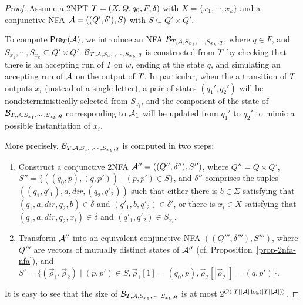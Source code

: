\begin{proof}
Assume a 2NPT $T=(X, Q, q_0, F, \delta)$ with $X = \{x_1,\cdots, x_k\}$ and a conjunctive NFA $\mathcal{A} = ((Q', \delta'), S)$ with $S \subseteq Q' \times Q'$. %

To compute $\textsf{Pre}_{T}(\mathcal{A})$, we introduce an NFA $\mathcal{B}_{T, \mathcal{A}, S_{x_1}, \cdots, S_{x_k}, q}$, %
%
where  $q \in F$, and  $S_{x_1}, \cdots, S_{x_k} \subseteq Q' \times Q'$.   
$\mathcal{B}_{T, \mathcal{A}, S_{x_1}, \cdots, S_{x_k}, q}$ is constructed from $T$  by checking that there is an accepting run of $T$ on $w$, ending at the state $q$, and simulating an accepting run of $\mathcal{A}$ on the output of $T$. In particular, when the a transition of $T$ outputs $x_i$ (instead of a single letter), a pair of states $(q_1', q_2')$ will be nondeterministically selected from $S_{x_i}$, and the component of the state of $\mathcal{B}_{T, \mathcal{A}, S_{x_1}, \cdots, S_{x_k}, q}$ corresponding to $\mathcal{A}_1$ will be updated from $q_1'$ to $q_2'$ to mimic a possible instantiation of $x_i$.  



More precisely, $\mathcal{B}_{T, \mathcal{A}, S_{x_1}, \cdots, S_{x_k}, q}$ is computed in two steps:
\begin{enumerate} 
\item Construct a conjunctive 2NFA $\mathcal{A}'' = ((Q'', \delta''), S'')$, where $Q'' = Q \times Q'$, $S'' = \{((q_0, p), (q, p')) \mid (p, p') \in S\}$, and $\delta''$ comprises the tuples $((q_1, q'_1), a, dir, (q_2, q'_2))$ such that either there is $b \in \Sigma$ satisfying that $(q_1, a, dir, q_2, b) \in \delta$ and $(q'_1, b, q'_2) \in \delta'$, or there is $x_i \in X$ satisfying that $(q_1, a, dir, q_2, x_i) \in \delta$  and $(q'_1, q'_2) \in S_{x_i}$.
%
\item Transform $\mathcal{A}''$ into an equivalent conjunctive NFA $((Q''',\delta'''), S''')$, where $Q'''$ are vectors of mutually distinct states of $\mathcal{A}''$ (cf. Proposition~\ref{prop-2nfa-nfa}),  and $S' = \{(\vec{\rho}_1, \vec{\rho}_2) \mid  (p, p') \in S, \vec{\rho}_1[1] =(q_0, p), \vec{\rho}_2[|\vec{\rho}_2|] = (q, p') \}$.
%
\end{enumerate} 
It is easy to see that  the size of $\mathcal{B}_{T, \mathcal{A}, S_{x_1}, \cdots, S_{x_k}, q}$ is at most 
$2^{O(|T||\mathcal{A}| \log(|T||\mathcal{A}|))}$.   


\end{proof}
